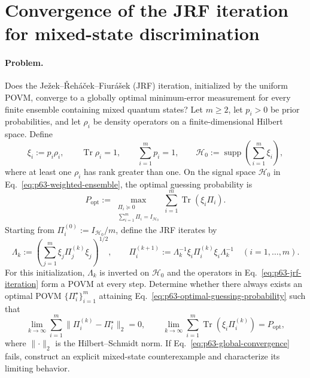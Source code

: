 \section{Convergence of the JRF iteration for mixed-state discrimination}
\label{sec:op_76e284219621a785}

\paragraph{Problem.}
Does the Je\v{z}ek--\v{R}eh\'{a}\v{c}ek--Fiur\'{a}\v{s}ek (JRF) iteration,
initialized by the uniform POVM, converge to a globally optimal
minimum-error measurement for every finite ensemble containing mixed quantum
states?  Let $m\geq2$, let $p_i>0$ be prior probabilities, and let $\rho_i$ be
density operators on a finite-dimensional Hilbert space.  Define
\begin{equation}
  \xi_i:=p_i\rho_i,
  \qquad
  \operatorname{Tr}\rho_i=1,
  \qquad
  \sum_{i=1}^{m}p_i=1,
  \qquad
  \mathcal H_0:=\operatorname{supp}\!\left(\sum_{i=1}^{m}\xi_i\right),
  \label{eq:p63-weighted-ensemble}
\end{equation}
where at least one $\rho_i$ has rank greater than one.  On the signal space
$\mathcal H_0$ in Eq.~\eqref{eq:p63-weighted-ensemble}, the optimal guessing
probability is
\begin{equation}
  P_{\mathrm{opt}}
  :=\max_{\substack{\Pi_i\succeq0\\
                    \sum_{i=1}^{m}\Pi_i=I_{\mathcal H_0}}}
       \sum_{i=1}^{m}\operatorname{Tr}(\xi_i\Pi_i).
  \label{eq:p63-optimal-guessing-probability}
\end{equation}
Starting from $\Pi_i^{(0)}:=I_{\mathcal H_0}/m$, define the JRF iterates by
\begin{equation}
  \Lambda_k
  :=\left(\sum_{j=1}^{m}
       \xi_j\Pi_j^{(k)}\xi_j\right)^{1/2},
  \qquad
  \Pi_i^{(k+1)}
  :=\Lambda_k^{-1}\xi_i\Pi_i^{(k)}\xi_i\Lambda_k^{-1}
  \quad (i=1,\ldots,m).
  \label{eq:p63-jrf-iteration}
\end{equation}
For this initialization, $\Lambda_k$ is inverted on $\mathcal H_0$ and the
operators in Eq.~\eqref{eq:p63-jrf-iteration} form a POVM at every step.
Determine whether there always exists an optimal POVM
$\{\Pi_i^\star\}_{i=1}^{m}$ attaining
Eq.~\eqref{eq:p63-optimal-guessing-probability} such that
\begin{equation}
  \lim_{k\to\infty}
       \sum_{i=1}^{m}\lVert\Pi_i^{(k)}-\Pi_i^\star\rVert_2=0,
  \qquad
  \lim_{k\to\infty}
       \sum_{i=1}^{m}\operatorname{Tr}(\xi_i\Pi_i^{(k)})
       =P_{\mathrm{opt}},
  \label{eq:p63-global-convergence}
\end{equation}
where $\lVert\cdot\rVert_2$ is the Hilbert--Schmidt norm.  If
Eq.~\eqref{eq:p63-global-convergence} fails, construct an explicit
mixed-state counterexample and characterize its limiting behavior.

